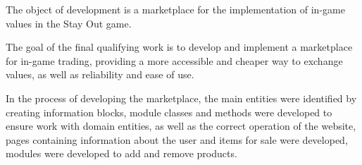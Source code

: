 The object of development is a marketplace for the implementation of in-game values ​​in the Stay Out game.

The goal of the final qualifying work is to develop and implement a marketplace for in-game trading, providing a more accessible and cheaper way to exchange values, as well as reliability and ease of use.

In the process of developing the marketplace, the main entities were identified by creating information blocks, module classes and methods were developed to ensure work with domain entities, as well as the correct operation of the website, pages containing information about the user and items for sale were developed, modules were developed to add and remove products.
